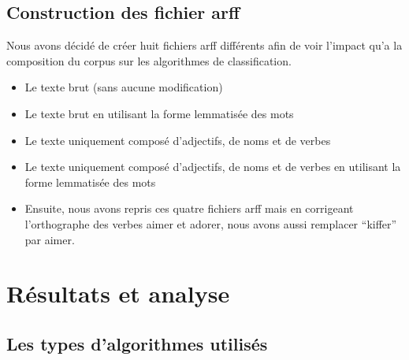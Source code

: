 \documentclass[a4paper,11pt]{report}
\begin{document}
\subsection{Construction des fichier arff}
Nous avons décidé de créer huit fichiers arff différents afin de voir l'impact qu'a la composition du corpus sur les algorithmes de classification.

\begin{itemize}
 \item Le texte brut (sans aucune modification)
 \item Le texte brut en utilisant la forme lemmatisée des mots
 \item Le texte uniquement composé d'adjectifs, de noms et de verbes
 \item Le texte uniquement composé d'adjectifs, de noms et de verbes en utilisant la forme lemmatisée des mots
 \vspace{0.5cm}
 \item Ensuite, nous avons repris ces quatre fichiers arff mais en corrigeant l'orthographe des verbes aimer et adorer, nous avons aussi remplacer ``kiffer'' par aimer.
\end{itemize}

\section{Résultats et analyse}

\subsection{Les types d'algorithmes utilisés}
\end{document}
